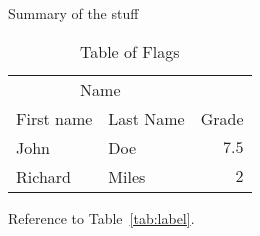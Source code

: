 Summary of the stuff

\begin{table}[hbt]
    \caption{Table of Flags}
    \centering
    \begin{tabular}{llr}
    \toprule
    \multicolumn{2}{c}{Name} \\
    \cmidrule(r){1-2}
    First name & Last Name & Grade \\
    \midrule
    John & Doe & $7.5$ \\
    Richard & Miles & $2$ \\
    \bottomrule
    \end{tabular}
    \label{tab:label}
    \end{table}
    
    Reference to Table~\vref{tab:label}. %
    
    